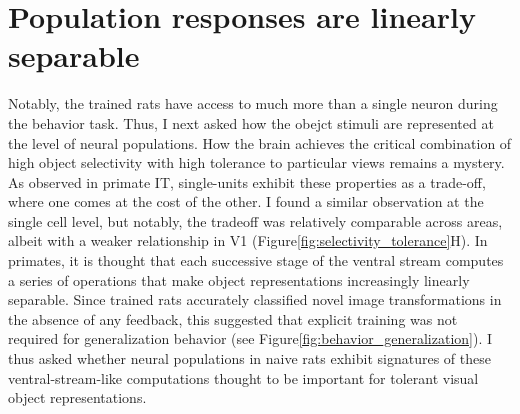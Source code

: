
\section{Population responses are linearly separable}
Notably, the trained rats have access to much more than a single neuron during the behavior task. Thus, I next asked how the obejct stimuli are represented at the level of neural populations. How the brain achieves the critical combination of high object selectivity with high tolerance to particular views remains a mystery. As observed in primate IT, single-units exhibit these properties as a trade-off, where one comes at the cost of the other\cite{Zoccolan2007}. I found a similar observation at the single cell level, but notably, the tradeoff was relatively comparable across areas, albeit with a weaker relationship in V1 (Figure\ref{fig:selectivity_tolerance}H). In primates, it is thought that each successive stage of the ventral stream computes a series of operations that make object representations increasingly linearly separable. Since trained rats accurately classified novel image transformations in the absence of any feedback, this suggested that explicit training was not required for generalization behavior (see Figure\ref{fig:behavior_generalization}). I thus asked whether neural populations in naive rats exhibit signatures of these ventral-stream-like computations thought to be important for tolerant visual object representations.

